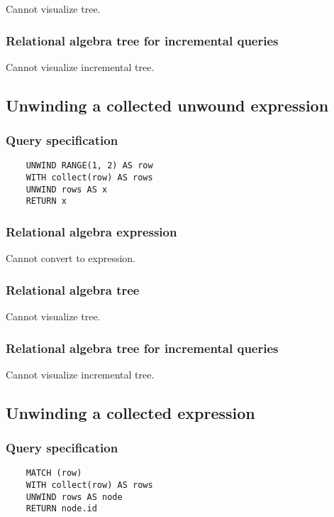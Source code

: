 	Cannot visualize tree.

	\subsubsection*{Relational algebra tree for incremental queries}

	Cannot visualize incremental tree.
	\subsection{Unwinding a collected unwound expression}

	\subsubsection*{Query specification}

	\begin{lstlisting}
	UNWIND RANGE(1, 2) AS row
	WITH collect(row) AS rows
	UNWIND rows AS x
	RETURN x
	\end{lstlisting}


	\subsubsection*{Relational algebra expression}

	Cannot convert to expression.

	\subsubsection*{Relational algebra tree}

	Cannot visualize tree.

	\subsubsection*{Relational algebra tree for incremental queries}

	Cannot visualize incremental tree.
	\subsection{Unwinding a collected expression}

	\subsubsection*{Query specification}

	\begin{lstlisting}
	MATCH (row)
	WITH collect(row) AS rows
	UNWIND rows AS node
	RETURN node.id
	\end{lstlisting}



